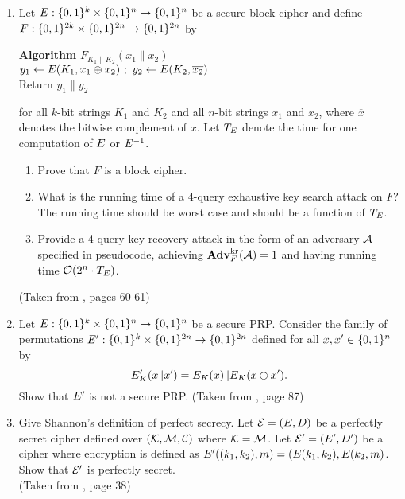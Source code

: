 \begin{enumerate}[label=\textbf{Exercise \thesection.\arabic*}, wide=0pt]
	\item Let $E : \{0,1\}^k \times \{0,1\}^n \to \{0,1\}^n$ be a secure block cipher and define $F : \{0,1\}^{2k} \times \{0,1\}^{2n} \to \{0,1\}^{2n}$ by
	\begin{center}
		\begin{minipage}{0.5\linewidth}
			\underline{\textbf{Algorithm} $F_{K_1 \| K_2}(x_1 \| x_2)$} \\
			$y_1 \gets \cipherE(K_1, x_1 \oplus x_2) \ ; \ y_2 \gets \cipherE(K_2, \overline{x_2})$ \\
			Return $y_1 \| y_2$
		\end{minipage}
	\end{center}
	for all $k$-bit strings $K_1$ and $K_2$ and all $n$-bit strings $x_1$ and $x_2$, where $\overline{x}$ denotes the bitwise complement of $x$. Let $T_E$ denote the time for one computation of $E$ or $E^{-1}$. 
	\begin{enumerate}
		\item Prove that $F$ is a block cipher.
		\item What is the running time of a 4-query exhaustive key search attack on $F$? The running time should be worst case and should be a function of $T_E$. 
		\item Provide a 4-query key-recovery attack in the form of an adversary ${\mathcal A}$ specified in pseudocode, achieving $\mathbf{Adv}^{\mathrm{kr}}_{F}({\mathcal A})=1$ and having running time ${\cal O}(2^n \cdot T_E)$. 
	\end{enumerate}
	(Taken from \cite{BellareBCNotes}, pages 60-61)
	
	\item Let $E : \{0,1\}^k \times \{0,1\}^n \to \{0,1\}^n$ be a secure PRP. Consider the family of permutations $E' : \{0,1\}^k \times \{0,1\}^{2n} \to \{0,1\}^{2n}$ defined for all $x,x' \in \{0,1\}^n$ by 
	\begin{equation*}
	E'_K(x \|x') = E_K(x) \| E_K(x \oplus x').
	\end{equation*}
	Show that $E'$ is not a secure PRP. 
	(Taken from \cite{BellareRogawayBook}, page 87)
	
	\item Give Shannon's definition of perfect secrecy. Let ${\cal E}=(E, D)$ be a perfectly secret cipher defined over $({\cal K},{\cal M},{\cal C})$ where ${\cal K}={\cal M}$. Let ${\cal E}' = (E',D')$ be a cipher where encryption is defined as $E'((k_1,k_2), m) = (E(k_1,k_2), E(k_2,m)$. Show that ${\cal E}'$ is perfectly secret. \\  
	(Taken from \cite{BonehShoupBook}, page 38)
\end{enumerate}